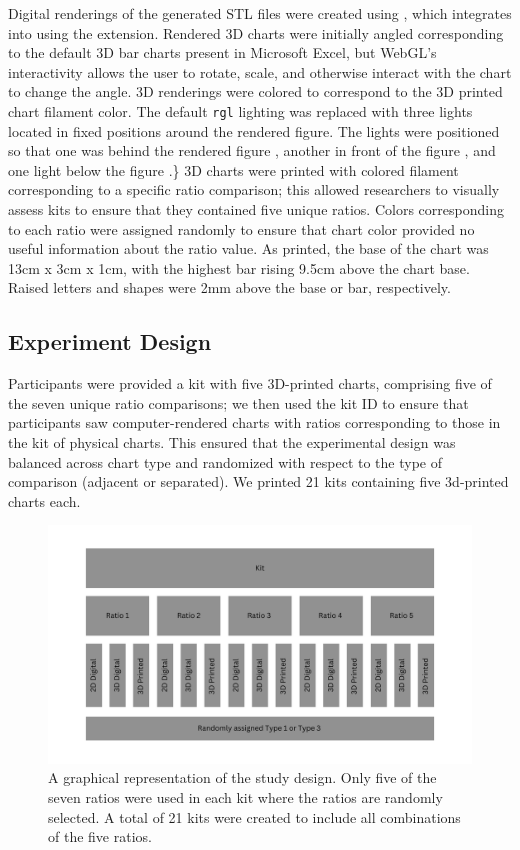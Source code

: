 \documentclass[letterpaper,inpress,dvipsnames]{jdsart}
\begin{document}
Digital renderings of the generated STL files were created using \citet{rgl} , which integrates into \citet{shiny} using the \citet{mozillafoundationWebGL2D3D2023} extension.
Rendered 3D charts were initially angled corresponding to the default 3D bar charts present in Microsoft Excel, but WebGL's interactivity allows the user to rotate, scale, and otherwise interact with the chart to change the angle. 3D renderings were colored to correspond to the 3D printed chart filament color.
The default \texttt{rgl} lighting was replaced with three lights located in fixed positions around the rendered figure.
The lights were positioned so that one was behind the rendered figure , another in front of the figure , and one light below the figure .\}
3D charts were printed with colored filament corresponding to a specific ratio comparison; this allowed researchers to visually assess kits to ensure that they contained five unique ratios.
Colors corresponding to each ratio were assigned randomly to ensure that chart color provided no useful information about the ratio value.
As printed, the base of the chart was 13cm x 3cm x 1cm, with the highest bar rising 9.5cm above the chart base.
Raised letters and shapes were 2mm above the base or bar, respectively.

\hypertarget{experiment-design}{%
\subsection{Experiment Design}\label{experiment-design}}

Participants were provided a kit with five 3D-printed charts, comprising five of the seven unique ratio comparisons; we then used the kit ID to ensure that participants saw computer-rendered charts with ratios corresponding to those in the kit of physical charts.
This ensured that the experimental design was balanced across chart type and randomized with respect to the type of comparison (adjacent or separated).
We printed 21 kits containing five 3d-printed charts each.

\begin{figure}
\includegraphics[width=6.4in]{study-design} \caption{A graphical representation of the study design. Only five of the seven ratios were used in each kit where the ratios are randomly selected. A total of 21 kits were created to include all combinations of the five ratios.}\label{fig:studyDesign}
\end{figure}
\end{document}
